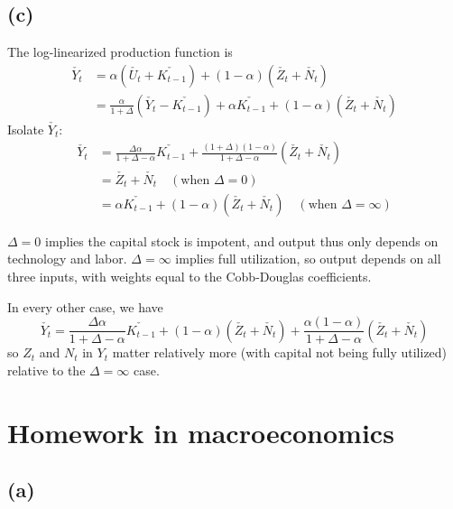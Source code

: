 \documentclass[11pt]{amsart}
\begin{document}
\subsection*{(c)}

The log-linearized production function is
	\begin{align*}
	\check{Y_t} &= \alpha \left( \check{U_t} + \check{K_{t-1}} \right) + (1-\alpha) \left(  \check{Z_t} + \check{N_t}\right) \\
	& = \frac{\alpha}{1 + \Delta} \left( \check{Y_t} - \check{K_{t-1}} \right) + \alpha \check{K_{t-1}} + (1-\alpha ) \left(  \check{Z_t} + \check{N_t}\right)
	\end{align*} 
	Isolate $\check{Y_t}$:
	\begin{align*}
	\check{Y_t} &= \frac{\Delta \alpha }{1 + \Delta - \alpha} \check{K_{t-1}} + \frac{(1+\Delta)(1-\alpha)}{1+ \Delta - \alpha} \left(  \check{Z_t} + \check{N_t} \right)  \\
	& = \check{Z_t} + \check{N_t} \quad \left( \text{when } \Delta = 0 \right) \\
	& = \alpha \check{K_{t-1}} + (1-\alpha) \left( \check{Z_t } + \check{N_t} \right)   \quad \left( \text{when } \Delta = \infty \right)
	\end{align*}

     $\Delta = 0$ implies the capital stock is impotent, and output thus only depends on technology and labor. 
$\Delta = \infty$ implies full utilization, so output depends on all three inputs, with weights equal to the Cobb-Douglas coefficients. 
    
In every other case, we have 
    \begin{equation*}
    \check{Y_t} = \frac{\Delta \alpha }{1 + \Delta - \alpha} \check{K_{t-1}} + (1-\alpha) \left( \check{Z_t} + \check{N_t} \right)+ \frac{\alpha (1-\alpha)}{1+ \Delta - \alpha} \left(  \check{Z_t} + \check{N_t} \right)
    \end{equation*}
    so $Z_t$ and $N_t$ in $Y_t$ matter relatively more (with capital not being fully utilized) relative to the $\Delta = \infty$ case. 


\section{Homework in macroeconomics}

\subsection*{(a)}
\end{document}

